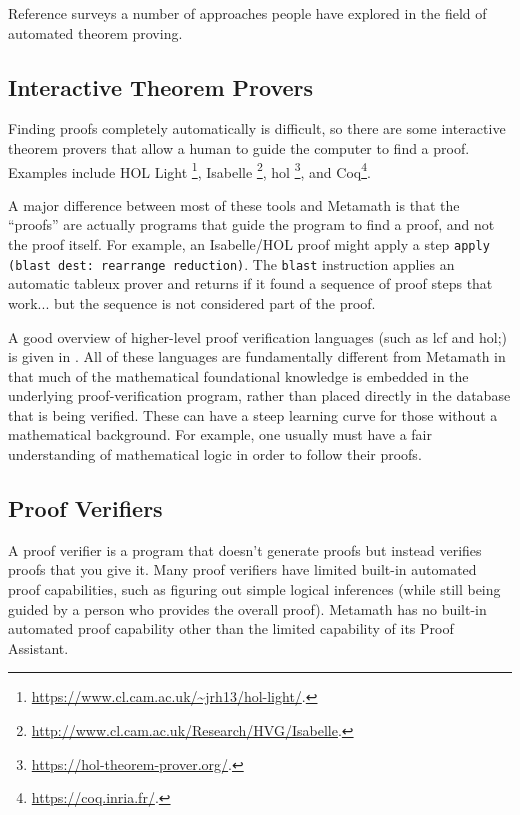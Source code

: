 Reference \cite{Bledsoe} surveys a number of approaches
people have explored in the field of automated theorem proving.

\subsection{Interactive Theorem Provers}\label{interactivetheoremprovers}

Finding proofs completely automatically is difficult, so there
are some interactive theorem provers that allow a human to guide the
computer to find a proof.
Examples include
HOL Light%
\footnote{\url{https://www.cl.cam.ac.uk/~jrh13/hol-light/}.},
Isabelle%
\footnote{\url{http://www.cl.cam.ac.uk/Research/HVG/Isabelle}.},
{\sc hol}%
\footnote{\url{https://hol-theorem-prover.org/}.},
and
Coq\footnote{\url{https://coq.inria.fr/}.}.

A major difference between most of these tools and Metamath is that the
``proofs'' are actually programs that guide the program to find a proof,
and not the proof itself.
For example, an Isabelle/HOL proof might apply a step
\texttt{apply (blast dest: rearrange reduction)}. The \texttt{blast}
instruction applies
an automatic tableux prover and returns if it found a sequence of proof
steps that work... but the sequence is not considered part of the proof.

A good overview of
higher-level proof verification languages (such as {\sc lcf} and {\sc hol};)
is given in \cite{Harrison}.  All of these languages are fundamentally
different from Metamath in that much of the mathematical foundational
knowledge is embedded in the underlying proof-verification program, rather
than placed directly in the database that is being verified.
These can have a steep learning curve for those without a mathematical
background.  For example, one usually must have a fair understanding of
mathematical logic in order to follow their proofs.

\subsection{Proof Verifiers}\label{proofverifiers}

A proof verifier is a program that doesn't generate proofs but instead
verifies proofs that you give it.  Many proof verifiers have limited built-in
automated proof capabilities, such as figuring out simple logical inferences
(while still being guided by a person who provides the overall proof).  Metamath
has no built-in automated proof capability other than the limited
capability of its Proof Assistant.

